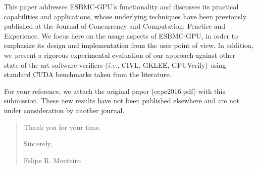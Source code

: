 \documentclass[11pt]{article}
\newcommand\vi{\vspace{\baselineskip}}
\begin{document}
\vi

This paper addresses ESBMC-GPU's functionality and discusses its practical capabilities and applications, whose underlying techniques have been previously published at the Journal of Concurrency and Computation: Practice and Experience. We focus here on the usage aspects of ESBMC-GPU, in order to emphasize its design and implementation from the user point of view. In addition, we present a rigorous experimental evaluation of our approach against other state-of-the-art software verifiers ({\it i.e.}, CIVL, GKLEE, GPUVerify) using standard CUDA benchmarks taken from the literature.

\vi

For your reference, we attach the original paper (ccpe2016.pdf) with this submission. These new results have not been published elsewhere and are not under consideration by another journal.

\vi

\begin{quote}
\begin{flushright}
Thank you for your time.~~~~~~~

Sincerely,~~~~~~~

Felipe R. Monteiro~~~~~~~~
\end{flushright}
\end{quote}
\end{document}
